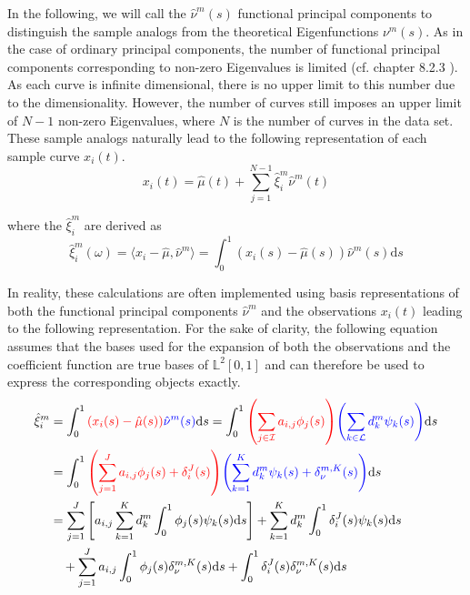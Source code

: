 \documentclass[11pt,twoside,a4paper]{article}
\begin{document}
	
	In the following, we will call the $\hat{\nu}^m(s)$ functional principal components to distinguish the sample analogs from the theoretical Eigenfunctions $\nu^m(s)$. As in the case of ordinary principal components, the number of functional principal components corresponding to non-zero Eigenvalues is limited (cf. chapter 8.2.3 \cite{ramsay_functional_2005}). As each curve is infinite dimensional, there is no upper limit to this number due to the dimensionality. However, the number of curves still imposes an upper limit of $N-1$ non-zero Eigenvalues, where $N$ is the number of curves in the data set.
	These sample analogs naturally lead to the following representation of each sample curve $x_i(t)$.
	\begin{equation}
		x_i(t) = \hat{\mu}(t) + \sum_{j = 1}^{N-1} \hat{\xi}_{i}^{m} \hat{\nu}^{m}(t)
	\end{equation}

	where the $\hat{\xi}_{i}^m$ are derived as 
	\begin{equation}
		\hat{\xi}_i^m(\omega) = \langle x_i - \hat{\mu}, \hat{\nu}^m\rangle = \int_{0}^{1} \left(x_i(s) - \hat{\mu}(s)\right) \hat{\nu}^m(s) \mathrm{d}s
	\end{equation}
	
	In reality, these calculations are often implemented using basis representations of both the functional principal components $\hat{\nu}^m$ and the observations $x_i(t)$ leading to the following representation. For the sake of clarity, the following equation assumes that the bases used for the expansion of both the observations and the coefficient function are true bases of $\mathbb{L}^2[0,1]$ and can therefore be used to express the corresponding objects exactly.
	\begin{equation}\label{FPCA_basis_expansion}
		\begin{split}
			\hat{\xi}_{i}^m & = \int_{0}^{1} {\color{red}\left( x_i(s) - \hat{\mu}(s)\right)} {\color{blue}\hat{\nu}^m(s)} \mathrm{d}s
			= \int_{0}^{1} {\color{red}\left(\sum_{j \in \mathcal{I}} a_{i,j} \phi_j(s)\right)} {\color{blue}\left(\sum_{k \in \mathcal{L}} d_{k}^m \psi_{k}(s)\right)} \mathrm{d}s \\
			& = \int_{0}^{1} {\color{red}\left(\sum_{j = 1}^{J} a_{i,j} \phi_j(s) + \delta_i^J(s)\right)} {\color{blue}\left(\sum_{k = 1}^{K} d_{k}^m \psi_{k}(s) + \delta_{\nu}^{m,K}(s)\right)} \mathrm{d}s \\
			& = \sum_{j = 1}^{J} \left[a_{i,j}\sum_{k = 1}^{K} d_{k}^m \int_{0}^{1} \phi_j(s) \psi_{k}(s)\mathrm{d}s \right] +  \sum_{k = 1}^{K} d_{k}^m \int_{0}^{1} \delta_i^J(s) \psi_{k}(s) \mathrm{d}s \\
			& \quad + \sum_{j = 1}^{J} a_{i,j} \int_{0}^{1}\phi_j(s) \delta_{\nu}^{m,K}(s) \mathrm{d}s + \int_{0}^{1} \delta_i^J(s) \delta_{\nu}^{m,K}(s) \mathrm{d}s
		\end{split}
	\end{equation}
	
\end{document}
